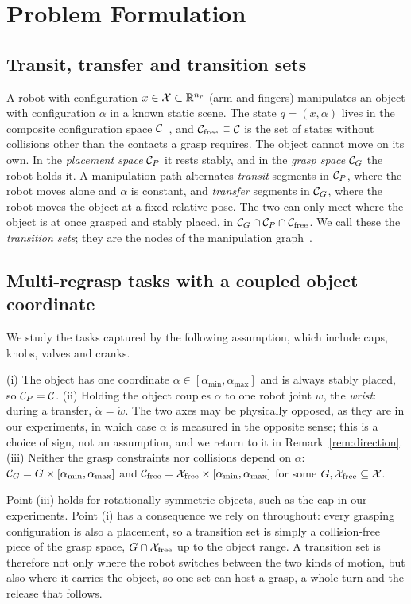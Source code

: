 \section{Problem Formulation}
\label{sec:problem}

\subsection{Transit, transfer and transition sets}
A robot with configuration $x\in\mathcal{X}\subset\mathbb{R}^{n_r}$ (arm and fingers)
manipulates an object with configuration $\alpha$ in a known static scene. The
state $q=(x,\alpha)$ lives in the composite configuration space
$\mathcal{C}$~\cite{simeon2004manipulation}, and $\mathcal{C}_{\mathrm{free}}\subseteq\mathcal{C}$ is the set of
states without collisions other than the contacts a grasp requires. The object
cannot move on its own. In the \emph{placement space} $\mathcal{C}_{P}$ it rests stably,
and in the \emph{grasp space} $\mathcal{C}_{G}$ the robot holds it. A manipulation path
alternates \emph{transit} segments in $\mathcal{C}_{P}$, where the robot moves alone and
$\alpha$ is constant, and \emph{transfer} segments in $\mathcal{C}_{G}$, where the robot
moves the object at a fixed relative pose. The two can only meet where the object is at once grasped and stably placed,
in $\mathcal{C}_{G}\cap\mathcal{C}_{P}\cap\mathcal{C}_{\mathrm{free}}$. We call these the \emph{transition sets}; they are
the nodes of the manipulation graph~\cite{simeon2004manipulation}.

\subsection{Multi-regrasp tasks with a coupled object coordinate}
We study the tasks captured by the following assumption, which include caps,
knobs, valves and cranks.
\begin{assumption}
\label{ass:task}
(i) The object has one coordinate $\alpha\in[\alpha_{\min},\alpha_{\max}]$
and is always stably placed, so $\mathcal{C}_{P}=\mathcal{C}$.
(ii) Holding the object couples $\alpha$ to one robot joint $w$, the
\emph{wrist}: during a transfer, $\dot\alpha=\dot w$. The two axes may be
physically opposed, as they are in our experiments, in which case $\alpha$ is
measured in the opposite sense; this is a choice of sign, not an assumption,
and we return to it in Remark~\ref{rem:direction}.
(iii) Neither the grasp constraints nor collisions depend on $\alpha$:
$\mathcal{C}_{G}=G\times[\alpha_{\min},\alpha_{\max}]$ and
$\mathcal{C}_{\mathrm{free}}=\mathcal{X}_{\mathrm{free}}\times[\alpha_{\min},\alpha_{\max}]$ for some
$G,\mathcal{X}_{\mathrm{free}}\subseteq\mathcal{X}$.
\end{assumption}
Point (iii) holds for rotationally symmetric objects, such as the cap in our
experiments. Point (i) has a consequence we rely on throughout: every grasping
configuration is also a placement, so a transition set is simply a
collision-free piece of the grasp space, $G\cap\mathcal{X}_{\mathrm{free}}$ up to the object range.
A transition set is therefore not only where the robot switches between the
two kinds of motion, but also where it carries the object, so one set can host
a grasp, a whole turn and the release that follows.

